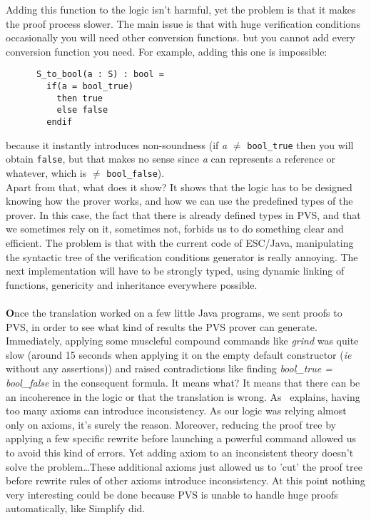 \documentclass[english,a4paper,10pt]{article}
\newcommand{\superParachute}[1]{\paragraph{}\textbf{#1}}
\newcommand{\BalleSousLeLit}[2]{
\bigskip
\bigskip
\begin{Large}\textbf{\begin{LARGE}#1\end{LARGE}#2}\end{Large}
}
\begin{document}
Adding this function to the logic isn't harmful, yet the problem is
that it makes the proof process slower. The main issue is that with
huge verification conditions occasionally you will need other
conversion functions.  but you cannot add every conversion function
you need. For example, adding this one is impossible:
\begin{verbatim}
      S_to_bool(a : S) : bool = 
        if(a = bool_true) 
          then true 
          else false
        endif
\end{verbatim} 
because it instantly introduces non-soundness (if \textit{a} $\neq$
\texttt{bool\_true} then you will obtain \texttt{false}, but that
makes no sense since \textit{a} can represents a reference or
whatever, which is $\neq$ \texttt{bool\_false}).\\

Apart from that, what does it show?  It shows that the logic has to be
designed knowing how the prover works, and how we can use the
predefined types of the prover. In this case, the fact that there is
already defined types in PVS, and that we sometimes rely on it,
sometimes not, forbids us to do something clear and efficient. The
problem is that with the current code of ESC/Java, manipulating the
syntactic tree of the verification conditions generator is really
annoying. The next implementation will have to be strongly typed,
using dynamic linking of functions, genericity and inheritance
everywhere possible.

\BalleSousLeLit{R}{esults with generated proofs}

\superParachute{O}nce the translation worked on a few little Java
programs, we sent proofs to PVS, in order to see what kind of results
the PVS prover can generate. Immediately, applying some muscleful
compound commands like \textit{grind} was quite slow (around 15
seconds when applying it on the empty default constructor (\textit{ie}
without any assertions)) and raised contradictions like finding
\textit{bool\_true = bool\_false} in the consequent formula. It means
what? It means that there can be an incoherence in the logic or that
the translation is wrong. As~\cite{3} explains, having too many axioms
can introduce inconsistency.  As our logic was relying almost only on
axioms, it's surely the reason. Moreover, reducing the proof tree by
applying a few specific rewrite before launching a powerful command
allowed us to avoid this kind of errors.  Yet adding axiom to an
inconsistent theory doesn't solve the problem\dots These additional
axioms just allowed us to 'cut' the proof tree before rewrite rules of
other axioms introduce inconsistency. At this point nothing very
interesting could be done because PVS is unable to handle huge proofs
automatically, like Simplify did.\\
\end{document}
